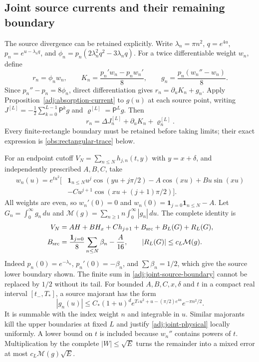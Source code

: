 \documentclass[11pt]{article}
\numberwithin{equation}{section}
\theoremstyle{definition}
\theoremstyle{remark}
\begin{document}
\subsection{Joint source currents and their remaining boundary}
\label{adj:joint-source}
The source divergence can be retained explicitly. Write
$\lambda_n=\pi n^2$, $q=e^{4u}$,
$p_n=e^{u-\lambda_nq}$, and
$\phi_n=p_n(2\lambda_n^2q^2-3\lambda_nq)$.
For a twice differentiable weight $w_n$, define
\begin{equation}
 r_n=\phi_nw_n,\qquad
 K_n=\frac{p_n'w_n-p_nw_n'}8,\qquad
 g_n=\frac{p_n(w_n''-w_n)}8.
 \label{adj:joint-source-reduction}
\end{equation}
Since $p_n''-p_n=8\phi_n$, direct differentiation gives
$r_n=\partial_uK_n+g_n$.
Apply Proposition~\ref{adj:absorption-current} to $g(u)$ at each
source point, writing
$J^{[L]}=-\frac12\sum_{k=0}^{L-1}\mathsf P^kg$ and
$\varrho^{[L]}=\mathsf P^Lg$. Then
\begin{equation}
 r_n=\Delta J_n^{[L]}+\partial_uK_n+\varrho_n^{[L]}.
 \label{adj:joint-identity}
\end{equation}
Every finite-rectangle boundary must be retained before taking limits;
their exact expression is \eqref{obs:rectangular-trace} below.

For an endpoint cutoff $V_N=\sum_{n\le N}h_{j,n}(t,y)$ with
$y=x+\delta$, and independently prescribed $A,B,C$, take
\begin{align*}
 w_n(u)=e^{tu^2}\bigl[&\mathbf1_{n\le N}u^j\cos(yu+j\pi/2)
       -A\cos(xu)+Bu\sin(xu)\\
       &-Cu^{j+1}\cos(xu+(j+1)\pi/2)\bigr].
\end{align*}
All weights are even, so $w_n'(0)=0$ and
$w_n(0)=\mathbf1_{j=0}\mathbf1_{n\le N}-A$.
Let $G_n=\int_0^\infty g_n\,du$ and
$\mathcal M(g)=\sum_{n\ge1}n\int_0^\infty|g_n|\,du$.
The complete identity is
\begin{align}
 V_N&=AH+BH_x+Ch_{j+1}+B_{\rm src}+B_L(G)+R_L(G),
 \label{adj:joint-physical}\\
 B_{\rm src}
 &=\frac{\mathbf1_{j=0}}8\sum_{n\le N}\beta_n-\frac A{16},
 \qquad |R_L(G)|\le c_L\mathcal M(g).
 \label{adj:joint-source-boundary}
\end{align}
Indeed $p_n(0)=e^{-\lambda_n}$, $p_n'(0)=-\beta_n$, and
$\sum\beta_n=1/2$, which give the source lower boundary shown.
The finite sum in \eqref{adj:joint-source-boundary} cannot be
replaced by $1/2$ without its tail.
For bounded $A,B,C,x,\delta$ and $t$ in a compact real interval
$[t_-,T_*]$, a source majorant has the form
\[
 |g_n(u)|\le C_*(1+u)^d
 e^{T_*u^2+u-(\pi/2)e^{4u}}e^{-\pi n^2/2}.
\]
It is summable with the index weight $n$ and integrable in $u$.
Similar majorants kill the upper boundaries at fixed $L$ and justify
\eqref{adj:joint-physical} locally uniformly. A lower bound on $t$
is included because $w_n''$ contains powers of $t$.
Multiplication by the complete $|W|\le\sqrt E$ turns the remainder
into a mixed error at most $c_L\mathcal M(g)\sqrt E$.
\end{document}
